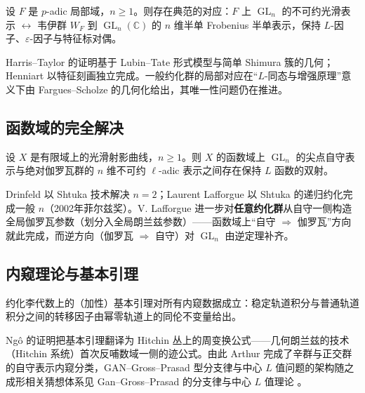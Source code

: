 \begin{theorem}\label{thm:local-langlands}
    设 $F$ 是 $p$-adic 局部域，$n \ge 1$。则存在典范的对应：$F$ 上 $\operatorname{GL}_n$ 的不可约光滑表示 $\leftrightarrow$ 韦伊群 $W_F$ 到 $\operatorname{GL}_n(\mathbb{C})$ 的 $n$ 维半单 Frobenius 半单表示，保持 $L$-因子、$\varepsilon$-因子与特征标对偶。
\end{theorem}

Harris--Taylor 的证明基于 Lubin--Tate 形式模型与简单 Shimura 簇的几何\cite{harristaylor2001}；Henniart 以特征刻画独立完成。一般约化群的局部对应在“$L$-同态与增强原理”意义下由 Fargues--Scholze 的几何化给出\cite{fargues2021}，其唯一性问题仍在推进。

\subsection{函数域的完全解决}

\begin{theorem}\label{thm:lafforgue}
    设 $X$ 是有限域上的光滑射影曲线，$n \ge 1$。则 $X$ 的函数域上 $\operatorname{GL}_n$ 的尖点自守表示与绝对伽罗瓦群的 $n$ 维不可约 $\ell$-adic 表示之间存在保持 $L$ 函数的双射。
\end{theorem}

Drinfeld 以 Shtuka 技术解决 $n = 2$\cite{drinfeld1983}；Laurent Lafforgue 以 Shtuka 的递归约化完成一般 $n$\cite{lafforgue2002}（2002年菲尔兹奖）。V. Lafforgue 进一步对\textbf{任意约化群}从自守一侧构造全局伽罗瓦参数（划分入全局朗兰兹参数）\cite{vlafforgue2018}——函数域上“自守 $\Rightarrow$ 伽罗瓦”方向就此完成，而逆方向（伽罗瓦 $\Rightarrow$ 自守）对 $\operatorname{GL}_n$ 由逆定理补齐。

\subsection{内窥理论与基本引理}

\begin{theorem}[Ng\^o, 2008]\label{thm:ngo}
    约化李代数上的（加性）基本引理对所有内窥数据成立：稳定轨道积分与普通轨道积分之间的转移因子由幂零轨道上的同伦不变量给出。
\end{theorem}

Ng\^o 的证明把基本引理翻译为 Hitchin 丛上的周变换公式\cite{ngo2010}——几何朗兰兹的技术（Hitchin 系统）首次反哺数域一侧的迹公式。由此 Arthur 完成了辛群与正交群的自守表示内窥分类\cite{arthur2013}，GAN--Gross--Prasad 型分支律与中心 $L$ 值问题的架构随之成形相关猜想体系见 Gan--Gross--Prasad 的分支律与中心 $L$ 值理论 \cite{ggp2012}。

